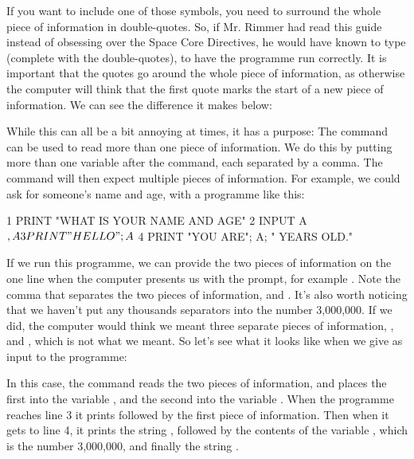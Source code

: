 \needspace{4cm}
If you want to include one of those symbols, you need to surround the
whole piece of information in double-quotes.  So, if Mr. Rimmer had
read this guide instead of obsessing over the Space Core Directives,
he would have known to type  (complete with the
double-quotes), to have the programme
  run correctly.  It is important that the quotes go around the whole
  piece of information, as otherwise the computer will think that the
  first quote marks the start of a new piece of information.  We can
  see the difference it makes below:


\needspace{1.5cm}
While this can all be a bit annoying at times, it has a purpose: The
 command can be used to read more than one piece of
information.  We do this by putting more than one variable after the
 command, each separated by a comma.  The 
command will then expect multiple pieces of information.  For example,
we could ask for someone's name and age, with a programme like this:

\begin{screenoutput}
  1 PRINT "WHAT IS YOUR NAME AND AGE"
  2 INPUT A$, A
  3 PRINT "HELLO "; A$
  4 PRINT "YOU ARE"; A; " YEARS OLD."
\end{screenoutput}

\needspace{4cm}
If we run this programme, we can provide the two pieces of information
on the one line when the computer presents us with the  prompt,
for example . Note the comma that separates the
two pieces of information,  and .  It's also
worth noticing that we haven't put any thousands separators into the
number 3,000,000.  If we did, the computer would think we meant three
separate pieces of information, ,  and ,
which is not what we meant.  So let's see what it looks like when we
give  as input to the programme:


In this case, the  command reads the two pieces of
information, and places the first into the variable , and the second
into the variable . When the programme reaches line 3 it prints
 followed by the first piece of information.
Then when it gets to line 4, it prints the string ,
followed by the contents of the variable , which is the number
3,000,000, and finally the string .

